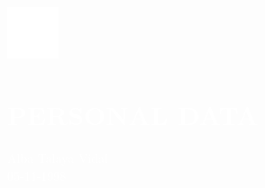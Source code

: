 \documentclass[../main.tex]{subfiles}
\begin{document}
    \hspace*{0.2cm}
    \begin{minipage}[t]{2cm}
        \vspace*{-0.3cm}\includegraphics[width=1.5cm]{../assets/person.png}
    \end{minipage}
    \begin{minipage}[t]{5cm}
    
        \section*{\textcolor{white}{PERSONAL DATA}}
        \vspace*{-0.25cm}
        \textcolor{white}{
            Alba Talaya Vidal \\
            05-11-1998
        }
    \end{minipage}
\end{document}
